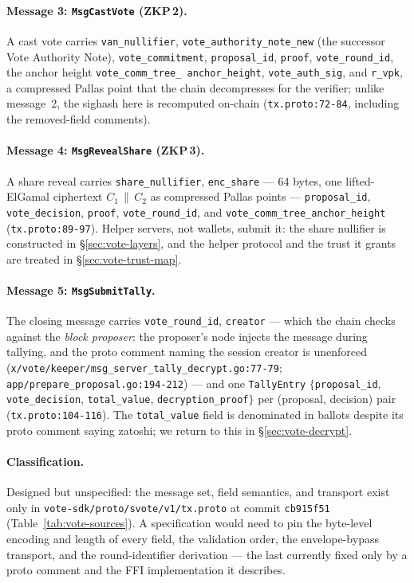 \documentclass[11pt,a4paper]{article}
\theoremstyle{definition}
\begin{document}
\paragraph{Message 3: \texttt{MsgCastVote} (ZKP\,2).} A cast vote carries
\texttt{van\_nullifier},
\texttt{vote\_\allowbreak authority\_\allowbreak note\_\allowbreak new}
(the successor
Vote Authority Note), \texttt{vote\_commitment}, \texttt{proposal\_id},
\texttt{proof}, \texttt{vote\_round\_id}, the anchor height
\texttt{vote\_\allowbreak comm\_\allowbreak tree\_\allowbreak
anchor\_\allowbreak height}, \texttt{vote\_auth\_sig}, and
\texttt{r\_vpk}, a compressed Pallas point that the chain decompresses for
the verifier; unlike message~2, the sighash here is recomputed on-chain
(\texttt{tx.proto:72-84}, including the removed-field comments).

\paragraph{Message 4: \texttt{MsgRevealShare} (ZKP\,3).} A share reveal
carries \texttt{share\_nullifier}, \texttt{enc\_share} --- 64 bytes, one
lifted-ElGamal ciphertext $C_1 \,\|\, C_2$ as compressed Pallas points ---
\texttt{proposal\_id}, \texttt{vote\_decision}, \texttt{proof},
\texttt{vote\_round\_id}, and \texttt{vote\_comm\_tree\_anchor\_height}
(\texttt{tx.proto:89-97}). Helper servers, not wallets, submit it: the
share nullifier is constructed in \S\ref{sec:vote-layers}, and the helper
protocol and the trust it grants are treated in
\S\ref{sec:vote-trust-map}.

\paragraph{Message 5: \texttt{MsgSubmitTally}.} The closing message carries
\texttt{vote\_round\_id}, \texttt{creator} --- which the chain checks
against the \emph{block proposer}: the proposer's node injects the message
during tallying, and the proto comment naming the session creator is
unenforced (\texttt{x/vote/keeper/msg\_server\_tally\_decrypt.go:77-79};
\texttt{app/prepare\_proposal.go:194-212}) --- and one \texttt{TallyEntry}
$\{$\texttt{proposal\_id}, \texttt{vote\_decision}, \texttt{total\_value},
\texttt{decryption\_proof}$\}$ per (proposal, decision) pair
(\texttt{tx.proto:104-116}). The \texttt{total\_value} field is denominated
in ballots despite its proto comment saying zatoshi; we return to this in
\S\ref{sec:vote-decrypt}.

\paragraph{Classification.} Designed but unspecified: the message set,
field semantics, and transport exist only in
\texttt{vote-sdk/proto/svote/v1/tx.proto} at commit \texttt{cb915f51}
(Table~\ref{tab:vote-sources}). A specification would need to pin the
byte-level encoding and length of every field, the validation order, the
envelope-bypass transport, and the round-identifier derivation --- the last
currently fixed only by a proto comment and the FFI implementation it
describes.
\end{document}
